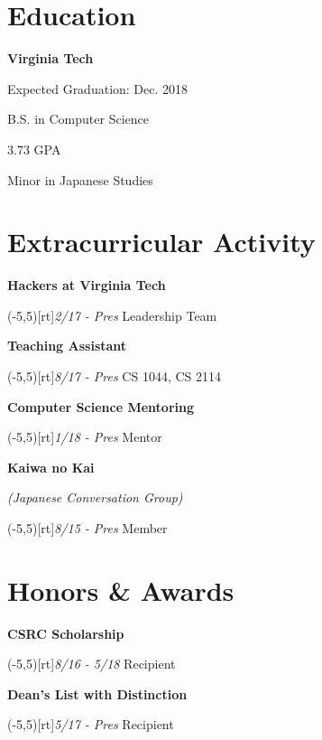 \documentclass[9pt]{extarticle}
\newcommand{\Subsection}[2]{
    {\normalsize\color{subsection}\textbf{#1}}
    \begin{trivlist}
        \color{bullet}
        #2
    \end{trivlist}
}
\newcommand{\ChronoItem}[2]{
    \item {%
        \makebox(-5,5)[rt]{\footnotesize\textit{#2}}%
        \color{bullet}#1
    }
}
\newcommand{\vsubspace}{\vspace{1.5em}}
\newcommand{\vmainspace}{\vspace{2em}}
\begin{document}
\begin{paracol}{2}
\begin{rightcolumn}
        \section{Education}
            \Subsection{Virginia Tech}{
                \item Expected Graduation: Dec. 2018
                \item B.S. in Computer Science
                \item 3.73 GPA
                \item Minor in Japanese Studies
            }
        \vmainspace
        \section{Extracurricular Activity}
            \Subsection{Hackers at Virginia Tech}{
                \ChronoItem{Leadership Team}{2/17 - Pres}
            }
            \vsubspace
            \Subsection{Teaching Assistant}{
                \ChronoItem{CS 1044, CS 2114}{8/17 - Pres}
            }
            \vsubspace
            \Subsection{Computer Science Mentoring}{
                \ChronoItem{Mentor}{1/18 - Pres}
            }
            \vsubspace
            \Subsection{Kaiwa no Kai}{
                \item {\color{lightColor}\textit{(Japanese Conversation Group)}}
                \ChronoItem{Member}{8/15 - Pres}
            }
        \vmainspace
        \section{Honors \& Awards}
            \Subsection{CSRC Scholarship}{
                \ChronoItem{Recipient}{8/16 - 5/18}
            }
            \vsubspace
            \Subsection{Dean's List with Distinction}{
                \ChronoItem{Recipient}{5/17 - Pres}
            }
    \end{rightcolumn}
\end{paracol}
\end{document}
